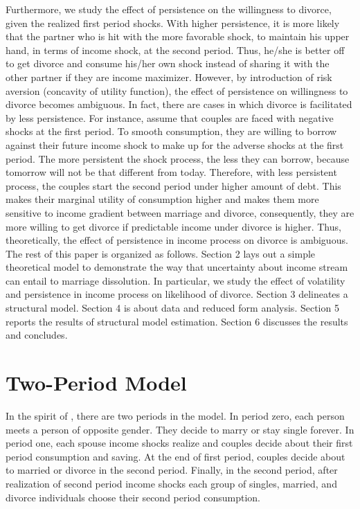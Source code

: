 Furthermore, we study the effect of persistence on the willingness to divorce, given the realized first period shocks. With higher persistence, it is more likely that the partner who is hit with the more favorable shock, to maintain his upper hand, in terms of income shock, at the second period. Thus, he/she is better off to get divorce and consume his/her own shock instead of sharing it with the other partner if they are income maximizer. However, by introduction of risk aversion (concavity of utility function), the effect of persistence on willingness to divorce becomes ambiguous. In fact, there are cases in which divorce is facilitated by less persistence. For instance, assume that couples are faced with negative shocks at the first period. To smooth consumption, they are willing to borrow against their future income shock to make up for the adverse shocks at the first period. The more persistent the shock process, the less they can borrow, because tomorrow will not be that different from today.  Therefore, with less persistent process, the couples start the second period under higher amount of debt.  This makes their marginal utility of consumption higher and makes them more sensitive to income gradient between marriage and divorce, consequently, they are more willing to get divorce if predictable income under divorce is higher. Thus, theoretically, the effect of persistence in income process on divorce is ambiguous. \\

The rest of this paper is organized as follows. Section 2 lays out a simple theoretical model to demonstrate the way that uncertainty about income stream can entail to marriage dissolution. In particular, we study the effect of volatility and persistence in income process on likelihood of divorce. Section 3 delineates a structural model. Section 4 is about data and reduced form analysis. Section 5 reports the results of structural model estimation. Section 6 discusses the results and concludes. \\


\section{Two-Period Model} 

In the spirit of \citet{Hess_2004}, there are two periods in the model. In period zero, each person meets a person of opposite gender. They decide to marry or stay single forever. In period one, each spouse income shocks realize and couples decide about their first period consumption and saving. At the end of first period, couples decide about to married or divorce in the second period. Finally, in the second period, after realization of second period income shocks each group of singles, married, and divorce individuals choose their second period consumption. \\

